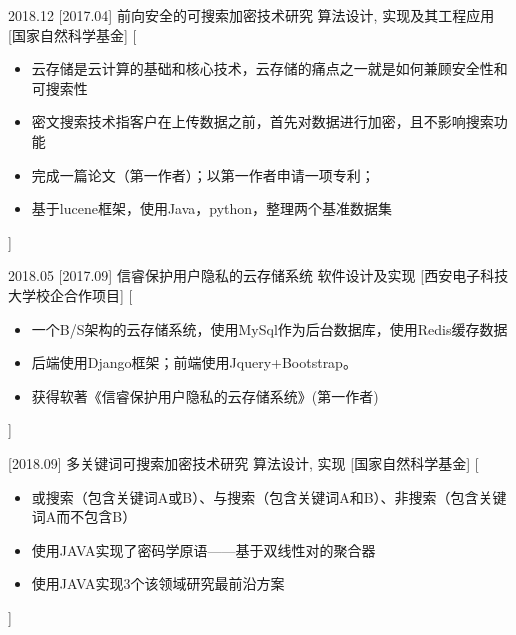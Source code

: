 \documentclass[zh]{resume}
\begin{document}
\begin{experiences}
  \experience
    {2018.12}%
    [2017.04]%
    {前向安全的可搜索加密技术研究}%
    {算法设计, 实现及其工程应用}%
    [国家自然科学基金]%
    [\begin{itemize}
      \item{\icon{\faFlag}} 云存储是云计算的基础和核心技术，云存储的痛点之一就是如何兼顾安全性和可搜索性
      \item{\icon{\faFlag}} 密文搜索技术指客户在上传数据之前，首先对数据进行加密，且不影响搜索功能
      \item{\icon{\faCheck}} 完成一篇论文（第一作者）；以第一作者申请一项专利；
      \item{\icon{\faCheck}} 基于lucene框架，使用Java，python，整理两个基准数据集  %
    \end{itemize}]%

  \separator{0.2em}
  \experience
    {2018.05}%
    [2017.09]%
    {信睿保护用户隐私的云存储系统}%
    {软件设计及实现}%
    [西安电子科技大学校企合作项目]%
    [\begin{itemize}
      \item{\icon{\faFlag}} 一个B/S架构的云存储系统，使用MySql作为后台数据库，使用Redis缓存数据
      \item{\icon{\faFlag}} 后端使用Django框架；前端使用Jquery+Bootstrap。
      \item{\icon{\faCheck}} 获得软著《信睿保护用户隐私的云存储系统》(第一作者)
    \end{itemize}]%

  \separator{0.2em}
  \experience
    {}
    [2018.09]%
    {多关键词可搜索加密技术研究}%
    {算法设计, 实现}%
    [国家自然科学基金]%
    [\begin{itemize}
      \item{\icon{\faFlag}} 或搜索（包含关键词A或B）、与搜索（包含关键词A和B）、非搜索（包含关键词A而不包含B）
      \item{\icon{\faCheck}} 使用JAVA实现了密码学原语——基于双线性对的聚合器 
      \item{\icon{\faCheck}} 使用JAVA实现3个该领域研究最前沿方案     
    \end{itemize}]%



\end{experiences}
\end{document}
